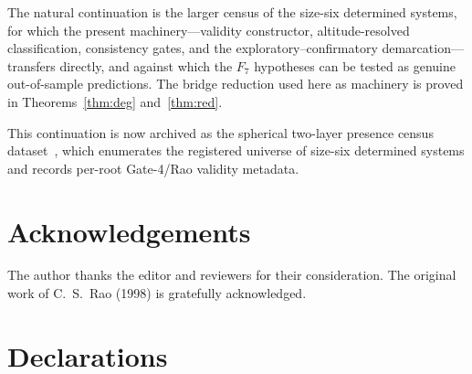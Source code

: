 \documentclass[pdflatex,sn-mathphys-num]{sn-jnl}
\theoremstyle{thmstyleone}%
\theoremstyle{thmstyletwo}%
\theoremstyle{thmstylethree}%
\begin{document}
The natural continuation is the larger census of the size-six determined systems, for which the present machinery---validity constructor, altitude-resolved classification, consistency gates, and the exploratory--confirmatory demarcation---transfers directly, and against which the $F_7$ hypotheses can be tested as genuine out-of-sample predictions. The bridge reduction used here as machinery is proved in Theorems~\ref{thm:deg} and~\ref{thm:red}.

This continuation is now archived as the spherical two-layer presence census dataset~\cite{sphericaldataset}, which enumerates the registered universe of size-six determined systems and records per-root Gate-4/Rao validity metadata.


\backmatter

\section*{Acknowledgements}
The author thanks the editor and reviewers for their consideration. The original work
of C.~S.~Rao (1998) is gratefully acknowledged.

\section*{Declarations}
\end{document}
